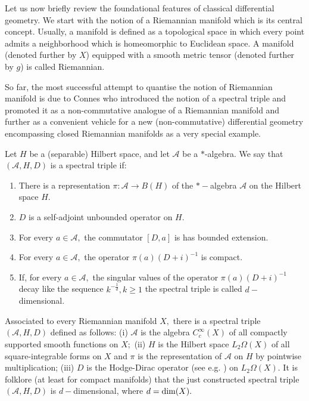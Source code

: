 \documentclass[12pt]{article}
\begin{document}
Let us now briefly review the foundational features of classical differential geometry. We start with the notion of a Riemannian manifold which is its central concept. Usually, a manifold is defined as a topological space in which every point admits a neighborhood which is homeomorphic to Euclidean space. A manifold (denoted further by $X$) equipped with a smooth metric tensor (denoted further by $g$) is called Riemannian.

So far, the most successful attempt to quantise the notion of Riemannian manifold is due to Connes who introduced the notion of a spectral triple and promoted it as a non-commutative analogue of a Riemannian manifold and further as a convenient vehicle for a new (non-commutative) differential geometry encompassing closed Riemannian manifolds as a very special example.  

Let $H$ be a (separable) Hilbert space, and let $\mathcal{A}$ be a $*$-algebra. We say that $(\mathcal{A},H,D)$ is a spectral triple if:
\begin{enumerate}
\item There is a representation $\pi:\mathcal{A}\to B(H)$ of the $\ast-$algebra $\mathcal{A}$ on the Hilbert space $H.$
\item $D$ is a self-adjoint unbounded operator on $H.$
\item For every $a\in\mathcal{A},$ the commutator $[D,a]$ is has bounded extension.
\item For every $a\in\mathcal{A},$ the operator $\pi(a)(D+i)^{-1}$ is compact.
\item If, for every $a\in\mathcal{A},$ the singular values of the operator $\pi(a)(D+i)^{-1}$ decay like the sequence $k^{-\frac1d},k\geq 1$ the spectral triple is called $d-$dimensional.
\end{enumerate}

Associated to every Riemannian manifold $X,$ there is a spectral triple $(\mathcal{A},H,D)$ defined as follows: (i) $\mathcal{A}$ is the algebra $C^{\infty}_c(X)$ of all compactly supported smooth functions on $X;$ (ii) $H$ is the Hilbert space $L_2\Omega(X)$ of all square-integrable forms on $X$ and $\pi$ is the representation of $\mathcal{A}$ on $H$ by pointwise multiplication; (iii) $D$ is the Hodge-Dirac operator (see e.g. \cite{BGV}) on $L_2\Omega(X).$ It is folklore (at least for compact manifolds) that the just constructed spectral triple $(\mathcal{A},H,D)$ is $d-$dimensional, where $d={\rm dim}(X).$ 

\end{document}
